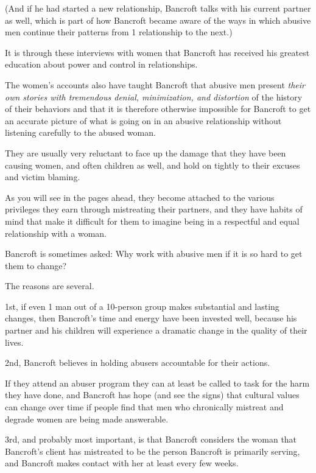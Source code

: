 \documentclass[oneside]{article}
\numberwithin{equation}{section}
\begin{document}
(And if he had started a new relationship, Bancroft talks with his current partner as well, which is part of how Bancroft became aware of the ways in which abusive men continue their patterns from 1 relationship to the next.)

It is through these interviews with women that Bancroft has received his greatest education about power and control in relationships.

The women's accounts also have taught Bancroft that abusive men present \textit{their own stories with tremendous denial, minimization, and distortion} of the history of their behaviors and that it is therefore otherwise impossible for Bancroft to get an accurate picture of what is going on in an abusive relationship without listening carefully to the abused woman.

%

They are usually very reluctant to face up the damage that they have been causing women, and often children as well, and hold on tightly to their excuses and victim blaming.

As you will see in the pages ahead, they become attached to the various privileges they earn through mistreating their partners, and they have habits of mind that make it difficult for them to imagine being in a respectful and equal relationship with a woman.

%
Bancroft is sometimes asked: Why work with abusive men if it is so hard to get them to change?

The reasons are several.

1st, if even 1 man out of a 10-person group makes substantial and lasting changes, then Bancroft's time and energy have been invested well, because his partner and his children will experience a dramatic change in the quality of their lives.

2nd, Bancroft believes in holding abusers accountable for their actions.

If they attend an abuser program they can at least be called to task for the harm they have done, and Bancroft has hope (and see the signs) that cultural values can change over time if people find that men who chronically mistreat and degrade women are being made answerable.

3rd, and probably most important, is that Bancroft considers the woman that Bancroft's client has mistreated to be the person Bancroft is primarily serving, and Bancroft makes contact with her at least every few weeks.
\end{document}
